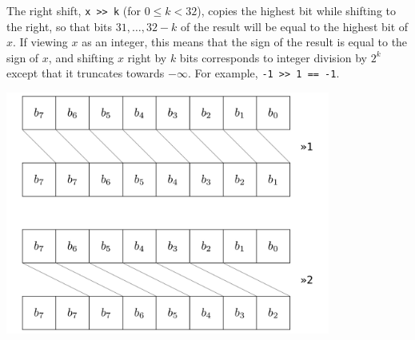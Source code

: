 \begin{gram}
The right shift, \lstinline'x >> k' (for $0 \leq k < 32$), copies the
highest bit while shifting to the right, so that bits $31, \ldots,
32-k$ of the result will be equal to the highest bit of $x$.
If viewing $x$ as an integer, this means that the sign of the result
is equal to the sign of $x$, and shifting $x$ right by $k$ bits
corresponds to integer division by $2^k$ except that it truncates
towards $-\infty$.  For example, \lstinline'-1 >> 1 == -1'.

\begin{center}
  \includegraphics[width=0.8\textwidth]{img/right-shift.png}
\end{center}
\end{gram}

